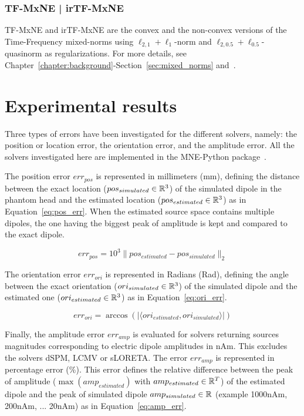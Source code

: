 \subsubsection{TF-MxNE | irTF-MxNE}
\Ac{TF-MxNE} and \ac{irTF-MxNE} are the convex and the non-convex versions of the Time-Frequency mixed-norms using $\ell_{2,1}+\ell_1$-norm and $\ell_{2,0.5}+\ell_{0.5}$-quasinorm as regularizations. For more details, see Chapter~\ref{chapter:background}-Section~\ref{sec:mixed_norms} and~\cite{TF-MxNE,bekhti2016m}.

\section{Experimental results}
Three types of errors have been investigated for the different solvers, namely: the position or location error, the orientation error, and the amplitude error. All the solvers investigated here are implemented in the MNE-Python package~\cite{mne-python,mne}.

The position error $err_{pos}$ is represented in millimeters (mm), defining the distance between the exact location ($pos_{simulated}\in\mathbb{R}^3$) of the simulated dipole in the phantom head and the estimated location ($pos_{estimated}\in\mathbb{R}^3$) as in Equation~\eqref{eq:pos_err}. When the estimated source space contains multiple dipoles, the one having the biggest peak of amplitude is kept and compared to the exact dipole.

\begin{equation}\label{eq:pos_err}
err_{pos} = 10^3 \|pos_{estimated} - pos_{simulated}\|_2
\end{equation}

The orientation error $err_{ori}$ is represented in Radians (Rad), defining the angle between the exact orientation ($ori_{simulated}\in\mathbb{R}^3$) of the simulated dipole and the estimated one ($ori_{estimated}\in\mathbb{R}^3$) as in Equation~\eqref{eq:ori_err}.

\begin{equation}\label{eq:ori_err}
err_{ori} = \arccos(|\langle ori_{estimated}, ori_{simulated} \rangle|)
\end{equation}

Finally, the amplitude error $err_{amp}$ is evaluated for solvers returning sources magnitudes corresponding to electric dipole amplitudes in nAm. This excludes the solvers dSPM, LCMV or sLORETA. The error $err_{amp}$ is represented in percentage error (\%). This error defines the relative difference between the peak of amplitude ($\max(amp_{estimated})$ with $amp_{estimated}\in\mathbb{R}^T$) of the estimated dipole and the peak of simulated dipole $amp_{simulated}\in\mathbb{R}$ (example 1000nAm, 200nAm, ... 20nAm) as in Equation~\eqref{eq:amp_err}.

